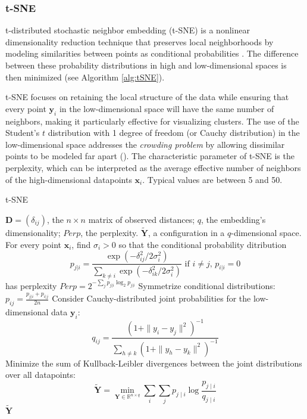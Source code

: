 \subsubsection{t-SNE}

t-distributed stochastic neighbor embedding (t-SNE) is a nonlinear dimensionality reduction technique that preserves local neighborhoods by modeling similarities between points as conditional probabilities \citep{Vandermaaten2008}. The difference between these probability distributions in high and low-dimensional spaces is then minimized (see Algorithm \ref{alg:tSNE}).

t-SNE focuses on retaining the local structure of the data while ensuring that every point $\mathbf{y}_i$ in the low-dimensional space will have the same number of neighbors, making it particularly effective for visualizing clusters. The use of the Student's $t$ distribution with 1 degree of freedom (or Cauchy distribution) in the low-dimensional space addresses the \textit{crowding problem} by allowing dissimilar points to be modeled far apart (\cite{Vandermaaten2008}). The characteristic parameter of t-SNE is the perplexity, which can be interpreted as the average effective number of neighbors of the high-dimensional datapoints $\mathbf{x}_i$. Typical values are between 5 and 50.

\begin{algorithm}
    \caption{t-SNE}
    \label{alg:tSNE}
    
    \begin{algorithmic}[1]
    \REQUIRE $\mathbf{D} = (\delta_{ij})$, the $n \times n$ matrix of observed distances; $q$, the embedding's dimensionality; $Perp$, the perplexity.
    \ENSURE $\mathbf{\tilde{Y}}$, a configuration in a $q$-dimensional space.
    \STATE For every point $\mathbf{x}_i$, find $\sigma_i > 0$ so that the conditional probability ditribution
        $$
        p_{j|i} = \frac{\exp(-\delta_{ij}^2/2\sigma_i^2)}{\sum_{k \neq i}\exp(-\delta_{ik}^2/2\sigma_i^2)}\text{ if } i \neq j, \, p_{i|i} = 0
        $$ has perplexity $ Perp = 2^{-\sum_{j} p_{j|i} \log_2 p_{j|i}} $
    \STATE Symmetrize conditional distributions: $p_{ij} = \frac{p_{j|i} + p_{i|j}}{2n}$
    \STATE Consider Cauchy-distributed joint probabilities for the low-dimensional data $\mathbf{y}_i$: $$q_{ij} = \frac{(1 + \|y_i-y_j\|^2)^{-1}}{\sum_{h \neq k}(1 + \|y_h-y_k\|^2)^{-1}}$$
    \STATE Minimize the sum of Kullback-Leibler divergences between the joint distributions over all datapoints: $$
    \mathbf{\tilde{Y}} = \min_{\mathbf{Y} \in \mathbb{R}^{n\times q}} \sum_i \sum_j p_{j \mid i} \log \frac{p_{j \mid i}}{q_{j \mid i}}
    $$
    \RETURN $\mathbf{\tilde{Y}}$
    
    \end{algorithmic}
\end{algorithm}

